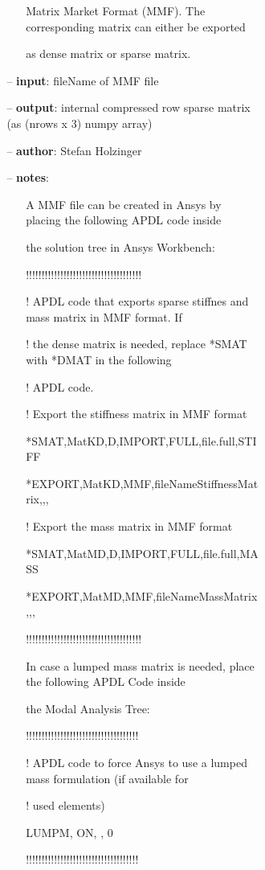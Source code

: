 \begin{itemize}[leftmargin=1.4cm]
\begin{itemize}[leftmargin=1.4cm]
\begin{itemize}[leftmargin=1.4cm]
\begin{itemize}[leftmargin=0.5cm]
\begin{itemize}[leftmargin=1.4cm]
\begin{itemize}[leftmargin=1.4cm]
\begin{itemize}[leftmargin=0.5cm]
\begin{itemize}[leftmargin=0.7cm]
\begin{itemize}[leftmargin=1.2cm]
\item[]Matrix Market Format (MMF). The corresponding matrix can either be exported
\item[]as dense matrix or sparse matrix.
\end{itemize}
\item[--]
{\bf input}: fileName of MMF file
\item[--]
{\bf output}: internal compressed row sparse matrix (as (nrows x 3) numpy array)
\item[--]
{\bf author}: Stefan Holzinger
\item[--]
{\bf notes}: \vspace{-6pt}
\begin{itemize}[leftmargin=1.2cm]
\setlength{\itemindent}{-0.7cm}
\item[]A MMF file can be created in Ansys by placing the following APDL code inside
\item[]the solution tree in Ansys Workbench:
\item[]!!!!!!!!!!!!!!!!!!!!!!!!!!!!!!!!!!!!!
\item[]! APDL code that exports sparse stiffnes and mass matrix in MMF format. If
\item[]! the dense matrix is needed, replace *SMAT with *DMAT in the following
\item[]! APDL code.
\item[]! Export the stiffness matrix in MMF format
\item[]*SMAT,MatKD,D,IMPORT,FULL,file.full,STIFF
\item[]*EXPORT,MatKD,MMF,fileNameStiffnessMatrix,,,
\item[]! Export the mass matrix in MMF format
\item[]*SMAT,MatMD,D,IMPORT,FULL,file.full,MASS
\item[]*EXPORT,MatMD,MMF,fileNameMassMatrix,,,
\item[]!!!!!!!!!!!!!!!!!!!!!!!!!!!!!!!!!!!!!
\item[]In case a lumped mass matrix is needed, place the following APDL Code inside
\item[]the Modal Analysis Tree:
\item[]!!!!!!!!!!!!!!!!!!!!!!!!!!!!!!!!!!!!
\item[]! APDL code to force Ansys to use a lumped mass formulation (if available for
\item[]! used elements)
\item[]LUMPM, ON, , 0
\item[]!!!!!!!!!!!!!!!!!!!!!!!!!!!!!!!!!!!!

\end{itemize}
\end{itemize}
\end{itemize}
\end{itemize}
\end{itemize}
\end{itemize}
\end{itemize}
\end{itemize}
\end{itemize}
